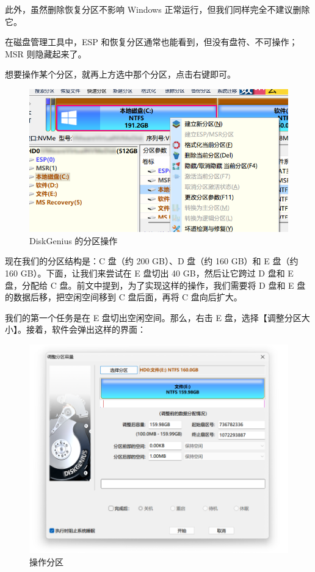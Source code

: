{此外，虽然删除恢复分区不影响 Windows 正常运行，但我们同样完全不建议删除它。

\begin{note}
  在磁盘管理工具中，ESP 和恢复分区通常也能看到，但没有盘符、不可操作；MSR 则隐藏起来了。
\end{note}

想要操作某个分区，就再上方选中那个分区，点击右键即可。

\begin{figure}[htb!]
  \centering
  \includegraphics[width=.5\textwidth]{assets/advanced/Part_Operation.png}
  \caption{DiskGenius 的分区操作}
  \label{fig:Part_Operation}
\end{figure}

现在我们的分区结构是：C 盘（约 200 GB）、D 盘（约 160 GB）和 E 盘（约 160 GB）。下面，让我们来尝试在 E 盘切出 40 GB，然后让它跨过 D 盘和 E 盘，分配给 C 盘。前文中提到，为了实现这样的操作，我们需要将 D 盘和 E 盘的数据后移，把空闲空间移到 C 盘后面，再将 C 盘向后扩大。

我们的第一个任务是在 E 盘切出空闲空间。那么，右击 E 盘，选择【调整分区大小】。接着，软件会弹出这样的界面：

\begin{figure}[htb!]
  \centering
  \includegraphics[width=.7\textwidth]{assets/advanced/Adjust_Part.png}
  \caption{操作分区}
  \label{fig:Adjust_Part}
\end{figure}

}
